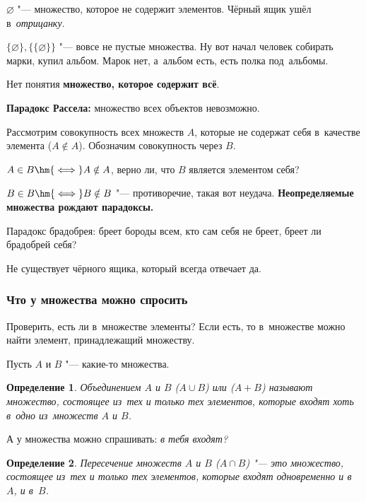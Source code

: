 \documentclass[a4paper,10pt,twoside]{article}
\newtheorem{Def}{Определение}[section]
\begin{document}
    $\varnothing$ "--- множество, которое не содержит элементов. Чёрный ящик ушёл в~\textit{отрицанку}.

    $\{\varnothing\},\big\{\{\varnothing\}\big\}$ "--- вовсе не пустые множества.
    Ну вот начал человек собирать марки, купил альбом. Марок нет, а~альбом есть, есть полка под~альбомы.

    Нет понятия \textbf{множество, которое содержит всё}.

    \textbf{Парадокс Рассела:} множество всех объектов невозможно.

    Рассмотрим совокупность всех множеств $A$, которые не содержат себя в~качестве элемента ($A\notin A$). Обозначим совокупность через $B$.

    $A\in B \hm{\iff} A\notin A$, верно ли, что $B$ является элементом себя?

    $B\in B \hm{\iff} B\notin B$ "--- противоречие, такая вот неудача. \textbf{Неопределяемые множества рождают парадоксы.}

    Парадокс брадобрея: бреет бороды всем, кто сам себя не бреет, бреет ли брадобрей себя?

    Не существует чёрного ящика, который всегда отвечает да.


\subsubsection{Что у множества можно спросить}

Проверить, есть ли в~множестве элементы? Если есть, то в~множестве можно найти элемент, принадлежащий множеству.

Пусть $A$ и $B$ "--- какие-то множества.

\begin{Def}
    Объединением $A$ и $B$  ($A\cup B$) или ($A+B$) называют множество, состоящее из~тех и только тех элементов, которые входят хоть в~одно из~множеств $A$ и $B$.
\end{Def}

А у множества можно спрашивать: \textit{в тебя входят?}


\begin{Def}
    Пересечение множеств $A$ и $B$  ($A\cap B$) "--- это множество, состоящее из~тех и только тех элементов, которые входят одновременно и в~$A$, и в~$B$.
\end{Def}
\end{document}
